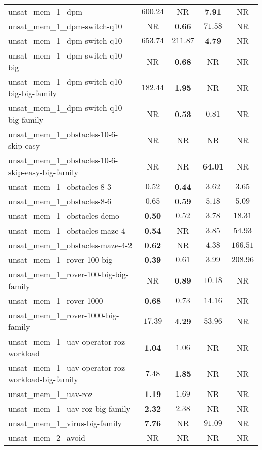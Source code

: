 \begin{tabular}{lcccc}
unsat\_mem\_1\_dpm & $600.24$ & NR & \textbf{7.91} & NR \\
unsat\_mem\_1\_dpm-switch-q10 & NR & \textbf{0.66} & $71.58$ & NR \\
unsat\_mem\_1\_dpm-switch-q10 & $653.74$ & $211.87$ & \textbf{4.79} & NR \\
unsat\_mem\_1\_dpm-switch-q10-big & NR & \textbf{0.68} & NR & NR \\
unsat\_mem\_1\_dpm-switch-q10-big-big-family & $182.44$ & \textbf{1.95} & NR & NR \\
unsat\_mem\_1\_dpm-switch-q10-big-family & NR & \textbf{0.53} & $0.81$ & NR \\
unsat\_mem\_1\_obstacles-10-6-skip-easy & NR & NR & NR & NR \\
unsat\_mem\_1\_obstacles-10-6-skip-easy-big-family & NR & NR & \textbf{64.01} & NR \\
unsat\_mem\_1\_obstacles-8-3 & $0.52$ & \textbf{0.44} & $3.62$ & $3.65$ \\
unsat\_mem\_1\_obstacles-8-6 & $0.65$ & \textbf{0.59} & $5.18$ & $5.09$ \\
unsat\_mem\_1\_obstacles-demo & \textbf{0.50} & $0.52$ & $3.78$ & $18.31$ \\
unsat\_mem\_1\_obstacles-maze-4 & \textbf{0.54} & NR & $3.85$ & $54.93$ \\
unsat\_mem\_1\_obstacles-maze-4-2 & \textbf{0.62} & NR & $4.38$ & $166.51$ \\
unsat\_mem\_1\_rover-100-big & \textbf{0.39} & $0.61$ & $3.99$ & $208.96$ \\
unsat\_mem\_1\_rover-100-big-big-family & NR & \textbf{0.89} & $10.18$ & NR \\
unsat\_mem\_1\_rover-1000 & \textbf{0.68} & $0.73$ & $14.16$ & NR \\
unsat\_mem\_1\_rover-1000-big-family & $17.39$ & \textbf{4.29} & $53.96$ & NR \\
unsat\_mem\_1\_uav-operator-roz-workload & \textbf{1.04} & $1.06$ & NR & NR \\
unsat\_mem\_1\_uav-operator-roz-workload-big-family & $7.48$ & \textbf{1.85} & NR & NR \\
unsat\_mem\_1\_uav-roz & \textbf{1.19} & $1.69$ & NR & NR \\
unsat\_mem\_1\_uav-roz-big-family & \textbf{2.32} & $2.38$ & NR & NR \\
unsat\_mem\_1\_virus-big-family & \textbf{7.76} & NR & $91.09$ & NR \\
unsat\_mem\_2\_avoid & NR & NR & NR & NR \\

\end{tabular}
